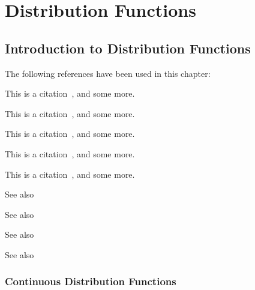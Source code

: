 %
%
%
%
%





\chapter{Distribution Functions}

\section{Introduction to Distribution Functions}
\label{DistributionFunctionsIntroduction} 

The following references have been used in this chapter:

This is a citation~\citet{walck_2007}, and some more.

This is a citation~\citet{VanHauwermeiren_2009}, and some more.

This is a citation~\citet{Rinne_book_2008}, and some more.

This is a citation~\citet{Johnson_1994}, and some more.

This is a citation~\citet{Johnson_1995}, and some more.
%
%
%


See also \cite{Monahan_2011}

See also \cite{Lange_2010}

See also \cite{Chernick_2008}

See also \cite{Cheney_2008}


\subsection{Continuous Distribution Functions}

